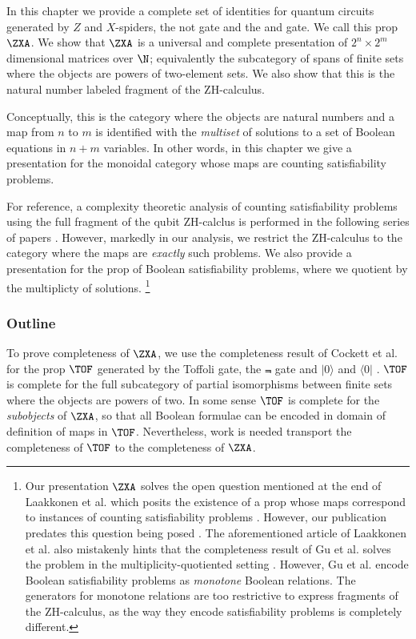 In this chapter we provide a complete set of identities for quantum circuits generated by $Z$ and $X$-spiders, the {\sf not} gate and the {\sf and} gate.  We call this prop $\ZXA$. We show that $\ZXA$ is a  universal and complete presentation of $2^n \times 2^m$ dimensional matrices over $\N$; equivalently the subcategory of spans of finite sets where the objects are powers of two-element sets. We also show that this is the natural number labeled fragment of the ZH-calculus.

Conceptually, this is the category where the objects are natural numbers  and a map from $n$ to $m$ is identified with the {\em multiset} of solutions to a set of Boolean equations in $n+m$ variables. In other words, in this chapter we give a presentation for the monoidal category whose maps are counting satisfiability problems. 

For reference, a complexity theoretic analysis of counting satisfiability problems using the full fragment of the qubit ZH-calclus is performed in the following series of papers \cite{koni,konii,koniii}. However, markedly in our analysis, we restrict the ZH-calculus to the category where the maps are {\em exactly} such problems.  We also provide a presentation for the prop of Boolean satisfiability problems, where we quotient by the multiplicty of solutions.  \footnote{Our presentation $\ZXA$ solves the open question mentioned at the end of Laakkonen et al. which posits the existence of a prop whose maps correspond to instances of counting satisfiability problems  \cite[\S 2.2]{koniii}.  However, our publication predates this question being posed \cite{zxa}. The aforementioned article of Laakkonen et al. also mistakenly hints that the completeness result of Gu et al. solves the problem in the multiplicity-quotiented setting \cite{Gu2023}. However, Gu et al. encode Boolean satisfiability problems as {\em monotone} Boolean relations.  The generators for monotone relations are too restrictive to express fragments of the ZH-calculus, as the way they encode satisfiability problems is completely different.}
\subsubsection{Outline}
To prove completeness of $\ZXA$, we use the completeness result of Cockett et al. for the prop $\TOF$  generated by the Toffoli gate, the $\Not$ gate  and $|0\rangle$ and $\langle 0|$ \cite{tof}. $\TOF$ is complete for the full subcategory of partial isomorphisms between finite sets where the objects are powers of two.
In some sense $\TOF$ is complete for the {\em subobjects} of $\ZXA$, so that all Boolean formulae can be encoded in domain of definition of maps in  $\TOF$.  Nevertheless, work is needed transport the completeness of $\TOF$ to the completeness of $\ZXA$.


